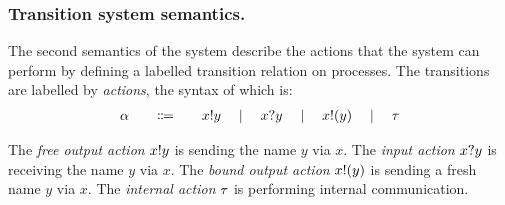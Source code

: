 \documentclass[runningheads]{llncs}
\begin{document}
\subsubsection{Transition system semantics.}
The second semantics of the system describe the actions that the system can perform by defining a labelled transition relation on processes.
The transitions are labelled by \emph{actions}, the syntax of which is:
\[
\begin{array}{r@{\qquad}c@{\qquad}l}
  \alpha & \Coloneqq & \Aoutf{x}{y} \quad\mid\quad \Ain{x}{y} \quad\mid\quad \Aoutb{x}{y} \quad\mid\quad \Atau
\end{array}
\]

The \emph{free output action} \( x ! y \) is sending the name \( y \) via \( x \).
The \emph{input action} \( x ? y \) is receiving the name \( y \) via \( x \).
The \emph{bound output action} \( x ! (y) \) is sending a fresh name \( y \) via \( x \).
The \emph{internal action} \( \tau \) is performing internal communication.
\end{document}
